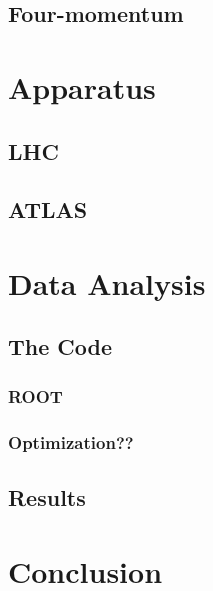 \documentclass[11pt,a4paper]{article}
\begin{document}
\subsection{Four-momentum}

\section{Apparatus}

\subsection{LHC}

\subsection{ATLAS}

\section{Data Analysis}

\subsection{The Code}

\subsubsection{ROOT}

\subsubsection{Optimization??}

\subsection{Results}

\section{Conclusion}

\printbibliography
\end{document}
